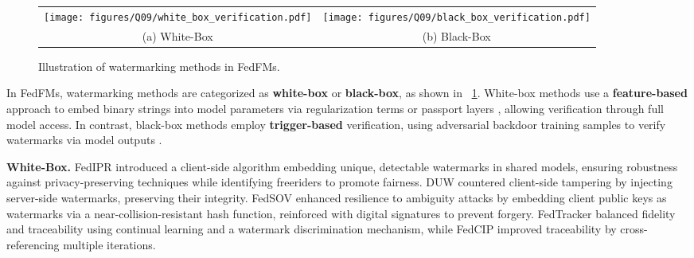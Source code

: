 \begin{figure}
    \centering
    \begin{adjustbox}{max width= \linewidth}
        \begin{tabular}{c c}
             \texttt{[image: figures/Q09/white\_box\_verification.pdf]}&  \texttt{[image: figures/Q09/black\_box\_verification.pdf]}\\
             (a) White-Box& (b) Black-Box\\ 
        \end{tabular}
    \end{adjustbox}
    \caption{Illustration of watermarking methods in FedFMs.}
    \label{fig: q09 watermark method}
    \vspace{-5mm}
\end{figure}



In FedFMs, watermarking methods are categorized as \textbf{white-box} or \textbf{black-box}, as shown in \fig~\ref{fig: q09 watermark method}. White-box methods use a \textbf{feature-based} approach to embed binary strings into model parameters via regularization terms \cite{uchida2017embedding,chen2018deepmarks,darvish2019deepsigns} or passport layers \cite{fan2019rethinking, fan2021deepipr}, allowing verification through full model access. In contrast, black-box methods employ \textbf{trigger-based} verification, using adversarial backdoor training samples to verify watermarks via model outputs \cite{adi2018turning,zhang2018protecting}.



\textbf{White-Box.} FedIPR \cite{li2022fedipr} introduced a client-side algorithm embedding unique, detectable watermarks in shared models, ensuring robustness against privacy-preserving techniques while identifying freeriders to promote fairness. DUW \cite{yu2023leakedmodeltrackingip} countered client-side tampering by injecting server-side watermarks, preserving their integrity. FedSOV \cite{yang2023fedsov} enhanced resilience to ambiguity attacks by embedding client public keys as watermarks via a near-collision-resistant hash function, reinforced with digital signatures to prevent forgery. FedTracker \cite{shao2024fedtrackerfurnishingownershipverification} balanced fidelity and traceability using continual learning and a watermark discrimination mechanism, while FedCIP \cite{liang2023fedcip} improved traceability by cross-referencing multiple iterations.

